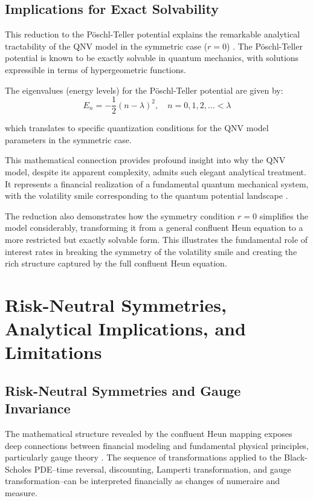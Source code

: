 \documentclass[a4paper,11pt]{article}
\begin{document}
\subsection{Implications for Exact Solvability}

This reduction to the Pöschl-Teller potential explains the remarkable analytical tractability of the QNV model in the symmetric case ($r = 0$) \cite{CarrFisherRuf2013}. The Pöschl-Teller potential is known to be exactly solvable in quantum mechanics, with solutions expressible in terms of hypergeometric functions.

The eigenvalues (energy levels) for the Pöschl-Teller potential are given by:
\begin{equation}
E_n = -\frac{1}{2}(n - \lambda)^2, \quad n = 0, 1, 2, \ldots < \lambda
\end{equation}

which translates to specific quantization conditions for the QNV model parameters in the symmetric case.

This mathematical connection provides profound insight into why the QNV model, despite its apparent complexity, admits such elegant analytical treatment. It represents a financial realization of a fundamental quantum mechanical system, with the volatility smile corresponding to the quantum potential landscape \cite{Zuhlsdorff2001}.

The reduction also demonstrates how the symmetry condition $r = 0$ simplifies the model considerably, transforming it from a general confluent Heun equation to a more restricted but exactly solvable form. This illustrates the fundamental role of interest rates in breaking the symmetry of the volatility smile and creating the rich structure captured by the full confluent Heun equation.

\section{Risk-Neutral Symmetries, Analytical Implications, and Limitations}

\subsection{Risk-Neutral Symmetries and Gauge Invariance}

The mathematical structure revealed by the confluent Heun mapping exposes deep connections between financial modeling and fundamental physical principles, particularly gauge theory \cite{MalaneyWeinstein1996,Ilinski2001}. The sequence of transformations applied to the Black-Scholes PDE--time reversal, discounting, Lamperti transformation, and gauge transformation--can be interpreted financially as changes of numeraire and measure.
\end{document}
